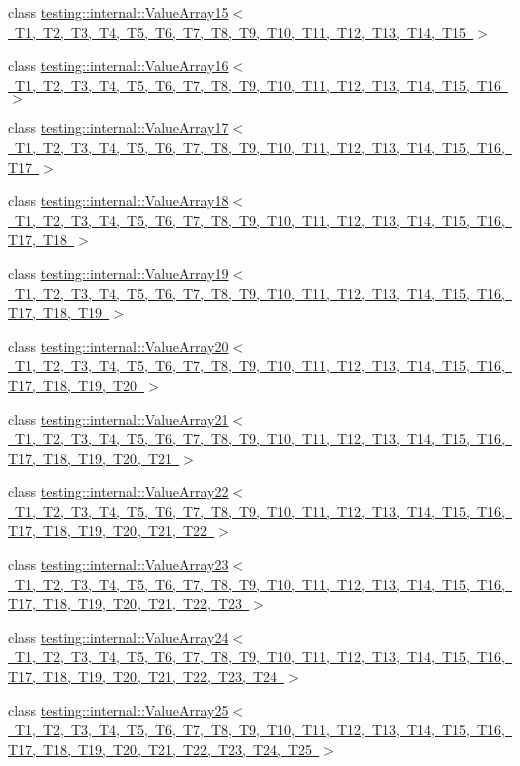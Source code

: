 \begin{DoxyCompactItemize}
\item 
class \mbox{\hyperlink{classtesting_1_1internal_1_1ValueArray15}{testing\+::internal\+::\+Value\+Array15$<$ T1, T2, T3, T4, T5, T6, T7, T8, T9, T10, T11, T12, T13, T14, T15 $>$}}
\item 
class \mbox{\hyperlink{classtesting_1_1internal_1_1ValueArray16}{testing\+::internal\+::\+Value\+Array16$<$ T1, T2, T3, T4, T5, T6, T7, T8, T9, T10, T11, T12, T13, T14, T15, T16 $>$}}
\item 
class \mbox{\hyperlink{classtesting_1_1internal_1_1ValueArray17}{testing\+::internal\+::\+Value\+Array17$<$ T1, T2, T3, T4, T5, T6, T7, T8, T9, T10, T11, T12, T13, T14, T15, T16, T17 $>$}}
\item 
class \mbox{\hyperlink{classtesting_1_1internal_1_1ValueArray18}{testing\+::internal\+::\+Value\+Array18$<$ T1, T2, T3, T4, T5, T6, T7, T8, T9, T10, T11, T12, T13, T14, T15, T16, T17, T18 $>$}}
\item 
class \mbox{\hyperlink{classtesting_1_1internal_1_1ValueArray19}{testing\+::internal\+::\+Value\+Array19$<$ T1, T2, T3, T4, T5, T6, T7, T8, T9, T10, T11, T12, T13, T14, T15, T16, T17, T18, T19 $>$}}
\item 
class \mbox{\hyperlink{classtesting_1_1internal_1_1ValueArray20}{testing\+::internal\+::\+Value\+Array20$<$ T1, T2, T3, T4, T5, T6, T7, T8, T9, T10, T11, T12, T13, T14, T15, T16, T17, T18, T19, T20 $>$}}
\item 
class \mbox{\hyperlink{classtesting_1_1internal_1_1ValueArray21}{testing\+::internal\+::\+Value\+Array21$<$ T1, T2, T3, T4, T5, T6, T7, T8, T9, T10, T11, T12, T13, T14, T15, T16, T17, T18, T19, T20, T21 $>$}}
\item 
class \mbox{\hyperlink{classtesting_1_1internal_1_1ValueArray22}{testing\+::internal\+::\+Value\+Array22$<$ T1, T2, T3, T4, T5, T6, T7, T8, T9, T10, T11, T12, T13, T14, T15, T16, T17, T18, T19, T20, T21, T22 $>$}}
\item 
class \mbox{\hyperlink{classtesting_1_1internal_1_1ValueArray23}{testing\+::internal\+::\+Value\+Array23$<$ T1, T2, T3, T4, T5, T6, T7, T8, T9, T10, T11, T12, T13, T14, T15, T16, T17, T18, T19, T20, T21, T22, T23 $>$}}
\item 
class \mbox{\hyperlink{classtesting_1_1internal_1_1ValueArray24}{testing\+::internal\+::\+Value\+Array24$<$ T1, T2, T3, T4, T5, T6, T7, T8, T9, T10, T11, T12, T13, T14, T15, T16, T17, T18, T19, T20, T21, T22, T23, T24 $>$}}
\item 
class \mbox{\hyperlink{classtesting_1_1internal_1_1ValueArray25}{testing\+::internal\+::\+Value\+Array25$<$ T1, T2, T3, T4, T5, T6, T7, T8, T9, T10, T11, T12, T13, T14, T15, T16, T17, T18, T19, T20, T21, T22, T23, T24, T25 $>$}}

\end{DoxyCompactItemize}

